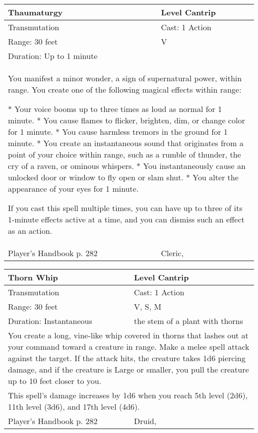 \documentclass[11pt]{report}
\begin{document}
\begin{table}[H]
	\begin{tabular}{||p{6cm}|p{6cm}||}
		\hline\hline
		\bf{Thaumaturgy} & Level Cantrip\\ \hline
		Transmutation & Cast: 1 Action\\ \hline
		Range: 30 feet & V\\ \hline
		Duration: Up to 1 minute & \\ \hline
		\multicolumn{2}{||p{12cm}||}{You manifest a minor wonder, a sign of supernatural power, within range. You create one of the following magical effects within range:

* Your voice booms up to three times as loud as normal for 1 minute.
* You cause flames to flicker, brighten, dim, or change color for 1 minute.
* You cause harmless tremors in the ground for 1 minute.
* You create an instantaneous sound that originates from a point of your choice within range, such as a rumble of thunder, the cry of a raven, or ominous whispers.
* You instantaneously cause an unlocked door or window to fly open or slam shut.
* You alter the appearance of your eyes for 1 minute.

If you cast this spell multiple times, you can have up to three of its 1-minute effects active at a time, and you can dismiss such an effect as an action.}\\ \hline
Player's Handbook p. 282 & Cleric, \\ \hline\hline
	\end{tabular}
\end{table}

\begin{table}[H]
	\begin{tabular}{||p{6cm}|p{6cm}||}
		\hline\hline
		\bf{Thorn Whip} & Level Cantrip\\ \hline
		Transmutation & Cast: 1 Action\\ \hline
		Range: 30 feet & V, S, M\\ \hline
		Duration: Instantaneous & the stem of a plant with thorns\\ \hline
		\multicolumn{2}{||p{12cm}||}{You create a long, vine-like whip covered in thorns that lashes out at your command toward a creature in range. Make a melee spell attack against the target. If the attack hits, the creature takes 1d6 piercing damage, and if the creature is Large or smaller, you pull the creature up to 10 feet closer to you.}\\ \hline
		\multicolumn{2}{||p{12cm}||}{This spell’s damage increases by 1d6 when you reach 5th level (2d6), 11th level (3d6), and 17th level (4d6).}\\ \hline
Player's Handbook p. 282 & Druid, \\ \hline\hline
	\end{tabular}
\end{table}
\end{document}
